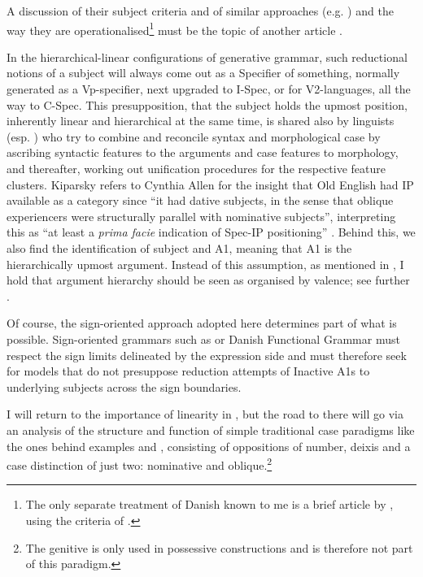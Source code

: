 \documentclass[output=paper]{langscibook}
\begin{document}
A discussion of their subject criteria and of similar approaches (e.g. \cite{Sigurðsson1989}) and the way they are operationalised\footnote{The only separate treatment of Danish known to me is a brief article by \citet{Hrafnbjargarson2003}, using the criteria of \citet{Sigurðsson1989}.} must be the topic of another article \citep{Heltoft2021b}.

In the hierarchical-linear configurations of generative grammar, such reductional notions of a subject will always come out as a Specifier of something, normally generated as a Vp-specifier, next upgraded to I-Spec, or for V2-languages, all the way to C-Spec. This presupposition, that the subject holds the upmost position, inherently linear and hierarchical at the same time, is shared also by linguists (esp. \citealt{Kiparsky1997}) who try to combine and reconcile syntax and morphological case by ascribing syntactic features to the arguments and case features to morphology, and thereafter, working out unification procedures for the respective feature clusters. Kiparsky refers to Cynthia Allen for the insight that Old English had IP available as a category since ``it had dative subjects, in the sense that oblique experiencers were structurally parallel with nominative subjects”, interpreting this as ``at least a \textit{prima facie} indication of Spec-IP positioning” \citep[12]{Kiparsky1997}. Behind this, we also find the identification of subject and A1, meaning that A1 is the hierarchically upmost argument. Instead of this assumption, as mentioned in , I hold that argument hierarchy should be seen as organised by valence; see further . 

Of course, the sign-oriented approach adopted here determines part of what is possible. Sign-oriented grammars such as \citet{Croft2001, TraugottTrousdale2013} or Danish Functional Grammar \citep{Engberg-PedersenEtAl1996} must respect the sign limits delineated by the expression side and must therefore seek for models that do not presuppose reduction attempts of Inactive A1s to underlying subjects across the sign boundaries.\largerpage

I will return to the importance of linearity in , but the road to there will go via an analysis of the structure and function of simple traditional case paradigms like the ones behind examples  and , consisting of oppositions of number, deixis and a case distinction of just two: nominative and oblique.\footnote{The genitive is only used in possessive constructions and is therefore not part of this paradigm.} 
\end{document}
